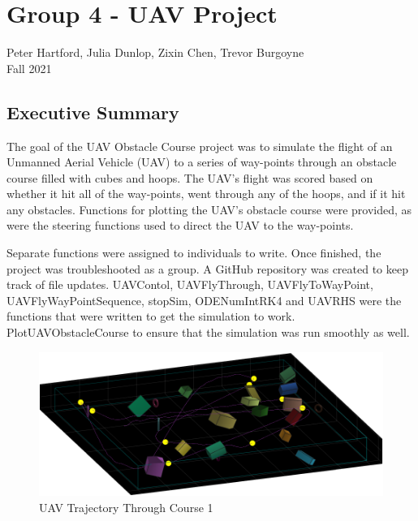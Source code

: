 \documentclass[12pt]{article}
\begin{document}
\section*{\centering Group 4 - UAV Project}
\begin{center} Peter Hartford, Julia Dunlop, Zixin Chen, Trevor Burgoyne\\
 Fall 2021\\
 \end{center}
\hrulefill
\subsection*{\centering Executive Summary} 

The goal of the UAV Obstacle Course project was to simulate the flight of an Unmanned Aerial Vehicle (UAV) to a series of way-points through an obstacle course filled with cubes and hoops. The UAV’s flight was scored based on whether it hit all of the way-points, went through any of the hoops, and if it hit any obstacles. Functions for plotting the UAV’s obstacle course were provided, as were the steering functions used to direct the UAV to the way-points.

Separate functions were assigned to individuals to write. Once finished, the project was troubleshooted as a group. A GitHub repository was created to keep track of file updates. UAVContol, UAVFlyThrough, UAVFlyToWayPoint, UAVFlyWayPointSequence, stopSim, ODENumIntRK4 and UAVRHS were the functions that were written to get the simulation to work. PlotUAVObstacleCourse to ensure that the simulation was run smoothly as well. \\


\begin{figure}
	\begin{center}
		\includegraphics[scale=0.5]{Course1Traj}
		\caption{UAV Trajectory Through Course 1}
	\end{center}
\end{figure} 
\end{document}
